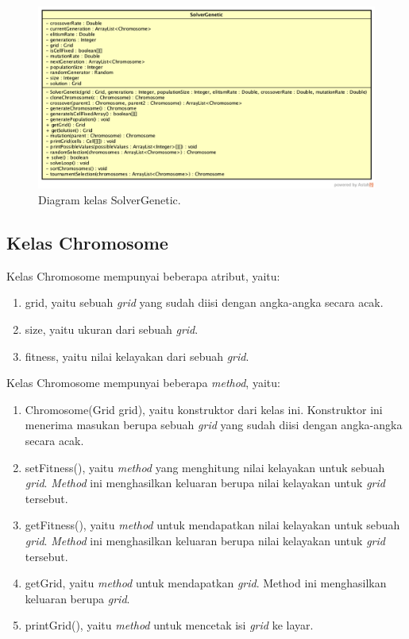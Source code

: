 \begin{figure}
\centering
\captionsetup{justification=centering}
\includegraphics[scale=0.3]{Gambar/Perancangan/DiagramKelasSolverGenetic.png}
\caption[Diagram kelas SolverGenetic.]{Diagram kelas SolverGenetic.}
\label{fig:diagramkelassolvergenetic}
\end{figure}

\subsection{Kelas Chromosome}
\label{sec:kelaschromosome}

Kelas Chromosome mempunyai beberapa atribut, yaitu:

\begin{enumerate}
\item grid, yaitu sebuah \textit{grid} yang sudah diisi dengan angka-angka secara acak.
\item size, yaitu ukuran dari sebuah \textit{grid}.
\item fitness, yaitu nilai kelayakan dari sebuah \textit{grid}.
\end{enumerate}

Kelas Chromosome mempunyai beberapa \textit{method}, yaitu:

\begin{enumerate}
\item Chromosome(Grid grid), yaitu konstruktor dari kelas ini. Konstruktor ini menerima masukan berupa sebuah \textit{grid} yang sudah diisi dengan angka-angka secara acak.
\item setFitness(), yaitu \textit{method} yang menghitung nilai kelayakan untuk sebuah \textit{grid}. \textit{Method} ini menghasilkan keluaran berupa nilai kelayakan untuk \textit{grid} tersebut.
\item getFitness(), yaitu \textit{method} untuk mendapatkan nilai kelayakan untuk sebuah \textit{grid}. \textit{Method} ini menghasilkan keluaran berupa nilai kelayakan untuk \textit{grid} tersebut.
\item getGrid, yaitu \textit{method} untuk mendapatkan \textit{grid}. Method ini menghasilkan keluaran berupa \textit{grid}.
\item printGrid(), yaitu \textit{method} untuk mencetak isi \textit{grid} ke layar.
\end{enumerate}

